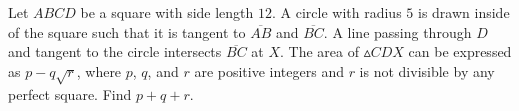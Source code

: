 Let $ABCD$ be a square with side length $12$. A circle with radius $5$ is drawn inside of the square such that it is tangent to $\overline{AB}$ and $\overline{BC}$. A line passing through $D$ and tangent to the circle intersects $\overline{BC}$ at $X$. The area of $\vartriangle CDX$ can be expressed as $p - q\sqrt{r}$, where $p$, $q$, and $r$ are positive integers and $r$ is not divisible by any perfect square. Find $p + q + r$.
